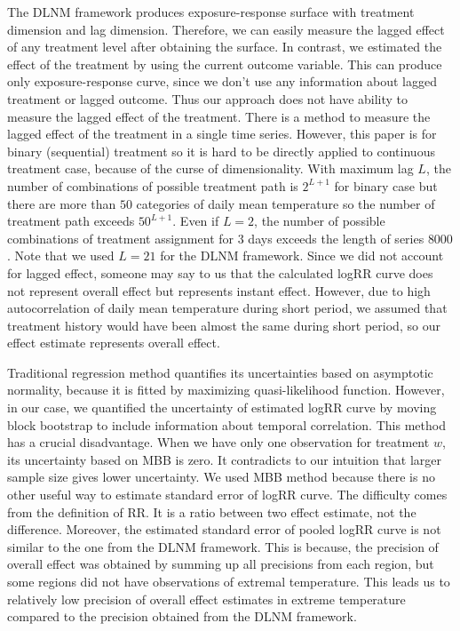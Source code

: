 \documentclass[12pt]{article}
\begin{document}
The DLNM framework produces exposure-response surface with treatment dimension and lag dimension.
Therefore, we can easily measure the lagged effect of any treatment level after obtaining the surface.
In contrast, we estimated the effect of the treatment by using the current outcome variable.
This can produce only exposure-response curve, 
since we don't use any information about lagged treatment or lagged outcome.
Thus our approach does not have ability to measure the lagged effect of the treatment.
There is a method to measure the lagged effect of the treatment in a single time series\cite{bojinov2019}.
However, this paper is for binary (sequential) treatment 
so it is hard to be directly applied to continuous treatment case,
because of the curse of dimensionality.
With maximum lag $L$, the number of combinations of possible treatment path is $2^{L+1}$ for binary case
but there are more than $50$ categories of daily mean temperature 
so the number of treatment path exceeds $50^{L+1}$.
Even if $L = 2$, 
the number of possible combinations of treatment assignment for 3 days exceeds the length of series $8000$.
Note that we used $L = 21$ for the DLNM framework.
Since we did not account for lagged effect, someone may say to us that 
the calculated logRR curve does not represent overall effect but represents instant effect.
However, due to high autocorrelation of daily mean temperature during short period, 
we assumed that treatment history would have been almost the same during short period,
so our effect estimate represents overall effect.

Traditional regression method quantifies its uncertainties based on asymptotic normality,
because it is fitted by maximizing quasi-likelihood function.
However, in our case, we quantified the uncertainty of estimated logRR curve by moving block bootstrap
to include information about temporal correlation.
This method has a crucial disadvantage.
When we have only one observation for treatment $w$, its uncertainty based on MBB is zero.
It contradicts to our intuition that larger sample size gives lower uncertainty.
We used MBB method because there is no other useful way to estimate standard error of logRR curve.
The difficulty comes from the definition of RR.
It is a ratio between two effect estimate, not the difference.
Moreover, the estimated standard error of pooled logRR curve is not similar to the one from the DLNM framework.
This is because,
the precision of overall effect was obtained by summing up all precisions from each region,
but some regions did not have observations of extremal temperature.
This leads us to relatively low precision of overall effect estimates in extreme temperature
compared to the precision obtained from the DLNM framework.
\end{document}
